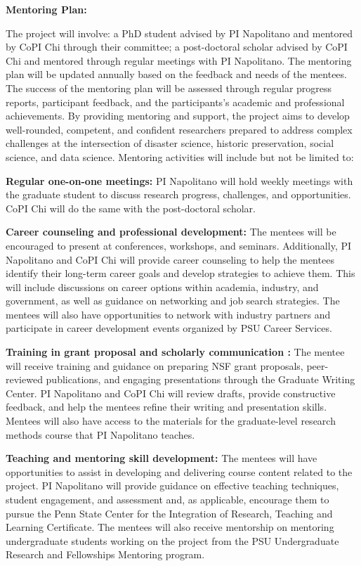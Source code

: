 \documentclass[11pt]{article}
\begin{document}
%
\pagestyle{empty} 

\noindent \textbf{Mentoring Plan:}

\noindent The project will involve: a PhD student advised by PI Napolitano and mentored by CoPI Chi through their committee; a post-doctoral scholar advised by CoPI Chi and mentored through regular meetings with PI Napolitano.
The mentoring plan will be updated annually based on the feedback and needs of the mentees. 
The success of the mentoring plan will be assessed through regular progress reports, participant feedback, and the participants’s academic and professional achievements. 
By providing mentoring and support, the project aims to develop well-rounded, competent, and confident researchers prepared to address complex challenges at the intersection of disaster science, historic preservation, social science, and data science. 
Mentoring activities will include but not be limited to: 

\noindent \textbf{Regular one-on-one meetings:} PI Napolitano will hold weekly meetings with the graduate student to discuss research progress, challenges, and opportunities. CoPI Chi will do the same with the post-doctoral scholar.

\noindent \textbf{Career counseling and professional development:} The mentees will be encouraged to present at conferences, workshops, and seminars. Additionally, PI Napolitano and CoPI Chi will provide career counseling to help the mentees identify their long-term career goals and develop strategies to achieve them. 
This will include discussions on career options within academia, industry, and government, as well as guidance on networking and job search strategies. 
The mentees will also have opportunities to network with industry partners and participate in career development events organized by PSU Career Services.

\noindent \textbf{Training in grant proposal and scholarly communication :} The mentee will receive training and guidance on preparing NSF grant proposals, peer-reviewed publications, and engaging presentations through the Graduate Writing Center. 
PI Napolitano and CoPI Chi will review drafts, provide constructive feedback, and help the mentees refine their writing and presentation skills. 
Mentees will also have access to the materials for the graduate-level research methods course that PI Napolitano teaches. 

\noindent \textbf{Teaching and mentoring skill development:} The mentees will have opportunities to assist in developing and delivering course content related to the project. 
PI Napolitano will provide guidance on effective teaching techniques, student engagement, and assessment and, as applicable, encourage them to pursue the Penn State Center for the Integration of Research, Teaching and Learning Certificate. 
The mentees will also receive mentorship on mentoring undergraduate students working on the project from the PSU Undergraduate Research and Fellowships Mentoring program.
\end{document}

